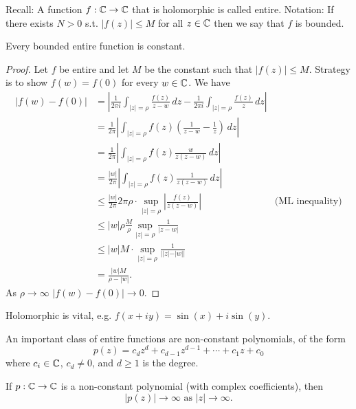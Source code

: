 \documentclass[10pt, a4paper]{article}
\begin{document}
Recall:
A function $f : \mathbb{C} \to \mathbb{C}$ that is holomorphic is called entire.
Notation:
If there exists $N > 0$ s.t. $|f(z)| \leq M$ for all $z \in \mathbb{C}$ then we say that $f$ is bounded.

\begin{theorem}
    Every bounded entire function is constant.

    \begin{proof}
        Let $f$ be entire and let $M$ be the constant such that $|f(z)| \leq M$.
        Strategy is to show $f(w) = f(0)$ for every $w \in \mathbb{C}$.
        We have
        \begin{align*}
            |f(w) - f(0)| &= \left|\frac{1}{2\pi i}\int_{|z| = \rho}\frac{f(z)}{z - w}\,dz - \frac{1}{2\pi i}\int_{|z| = \rho}\frac{f(z)}{z}\,dz\right| \\
            &= \frac{1}{2\pi}\left|\int_{|z| = \rho}f(z)\left(\frac{1}{z - w} - \frac{1}{z}\right)\,dz\right| \\
            &= \frac{1}{2\pi}\left|\int_{|z| = \rho}f(z)\frac{w}{z(z - w)}\,dz\right| \\
            &= \frac{|w|}{2\pi}\left|\int_{|z| = \rho}f(z)\frac{1}{z(z - w)}\,dz\right| \\
            &\leq \frac{|w|}{2\pi}2\pi \rho\cdot\sup_{|z| = \rho}\left|\frac{f(z)}{z(z - w)}\right| &\text{(ML inequality)}\\
            &\leq |w|\rho\frac{M}{\rho}\sup_{|z| = \rho}\frac{1}{|z - w|} \\
            &\leq |w|M\cdot\sup_{|z| = \rho}\frac{1}{||z| - |w||} \\
            &= \frac{|w|M}{\rho - |w|}.
        \end{align*}
        As $\rho \to \infty$ $|f(w) - f(0)| \to 0$.
    \end{proof}
\end{theorem}
Holomorphic is vital,
e.g. $f(x + iy) = \sin(x) + i\sin(y)$.

An important class of entire functions are non-constant polynomials,
of the form
\[
p(z) = c_dz ^ d + c_{d - 1}z ^ {d - 1} + \dotsi + c_1z + c_0
\]
where $c_i \in \mathbb{C}$,
$c_d \neq 0$,
and $d \geq 1$ is the degree.

\begin{proposition}
    If $p : \mathbb{C} \to \mathbb{C}$ is a non-constant polynomial
    (with complex coefficients),
    then
    \[
    |p(z)| \to \infty\text{ as } |z| \to \infty.
    \]
\end{proposition}
\end{document}
